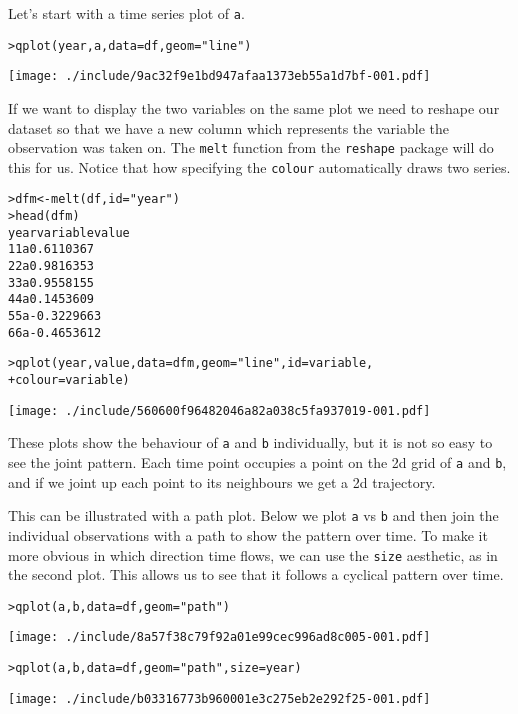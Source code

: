 Let's start with a time series plot of {\tt a}.

\begin{alltt}
> qplot(year, a, data = df, geom = "line")
\end{alltt}
\texttt{[image: ./include/9ac32f9e1bd947afaa1373eb55a1d7bf-001.pdf]}
\begin{alltt}

\end{alltt}

If we want to display the two variables on the same plot we need to reshape our dataset so that we have a new column which represents the variable the observation was taken on.  The {\tt melt} function from the {\tt reshape} package will do this for us.  Notice that how specifying the {\tt colour} automatically draws two series.

\begin{alltt}
> dfm <- melt(df, id = "year")
> head(dfm)
  year variable      value
1    1        a  0.6110367
2    2        a  0.9816353
3    3        a  0.9558155
4    4        a  0.1453609
5    5        a -0.3229663
6    6        a -0.4653612

> qplot(year, value, data = dfm, geom = "line", id = variable, 
+     colour = variable)
\end{alltt}
\texttt{[image: ./include/560600f96482046a82a038c5fa937019-001.pdf]}
\begin{alltt}

\end{alltt}

These plots show the behaviour of {\tt a} and {\tt b} individually, but it is not so easy to see the joint pattern.  Each time point occupies a point on the 2d grid of {\tt a} and {\tt b}, and if we joint up each point to its neighbours we get a 2d trajectory.

This can be illustrated with a path plot.  Below we plot {\tt a} vs {\tt b} and then join the individual observations with a path to show the pattern over time.  To make it more obvious in which direction time flows, we can use the {\tt size} aesthetic, as in the second plot.   This allows us to see that it follows a cyclical pattern over time.

\begin{alltt}
> qplot(a, b, data = df, geom = "path")
\end{alltt}
\texttt{[image: ./include/8a57f38c79f92a01e99cec996ad8c005-001.pdf]}
\begin{alltt}

> qplot(a, b, data = df, geom = "path", size = year)
\end{alltt}
\texttt{[image: ./include/b03316773b960001e3c275eb2e292f25-001.pdf]}
\begin{alltt}

\end{alltt}

